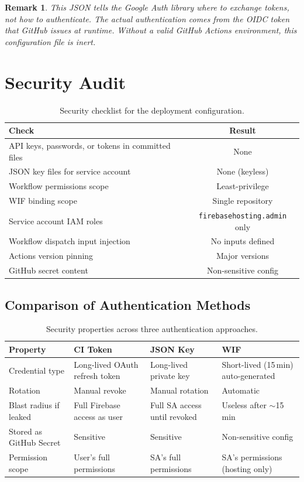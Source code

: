 \documentclass[11pt,a4paper]{article}
\theoremstyle{plainref}
\newtheorem{remark}[definition]{Remark}
\begin{document}
\begin{remark}
This JSON tells the Google Auth library \emph{where} to exchange tokens, not
\emph{how} to authenticate. The actual authentication comes from the OIDC token
that GitHub issues at runtime. Without a valid GitHub Actions environment, this
configuration file is inert.
\end{remark}

\section{Security Audit}

\begin{table}[h]
\centering
\caption{Security checklist for the deployment configuration.}
\begin{tabular}{@{}lc@{}}
\toprule
\textbf{Check} & \textbf{Result} \\
\midrule
API keys, passwords, or tokens in committed files & None \\
JSON key files for service account & None (keyless) \\
Workflow permissions scope & Least-privilege \\
WIF binding scope & Single repository \\
Service account IAM roles & \texttt{firebasehosting.admin} only \\
Workflow dispatch input injection & No inputs defined \\
Actions version pinning & Major versions \\
GitHub secret content & Non-sensitive config \\
\bottomrule
\end{tabular}
\end{table}

\subsection{Comparison of Authentication Methods}

\begin{table}[h]
\centering
\caption{Security properties across three authentication approaches.}
\begin{tabular}{@{}lp{3.3cm}p{3.3cm}p{3.3cm}@{}}
\toprule
\textbf{Property} & \textbf{CI Token} & \textbf{JSON Key} & \textbf{WIF} \\
\midrule
Credential type & Long-lived OAuth refresh token & Long-lived private key & Short-lived (15\,min) auto-generated \\
Rotation & Manual revoke & Manual rotation & Automatic \\
Blast radius if leaked & Full Firebase access as user & Full SA access until revoked & Useless after $\sim$15\,min \\
Stored as GitHub Secret & Sensitive & Sensitive & Non-sensitive config \\
Permission scope & User's full permissions & SA's full permissions & SA's permissions (hosting only) \\
\bottomrule
\end{tabular}
\end{table}
\end{document}

